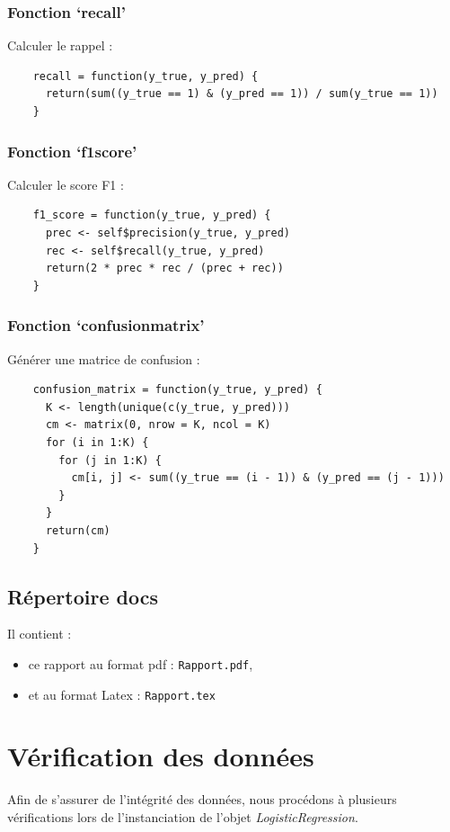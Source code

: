 \documentclass[10pt,french]{report}
\begin{document}
    \subsubsection{Fonction \enquote*{recall}}

    Calculer le rappel :
    \begin{verbatim}
    recall = function(y_true, y_pred) {
      return(sum((y_true == 1) & (y_pred == 1)) / sum(y_true == 1))
    }
    \end{verbatim}

    \subsubsection{Fonction \enquote*{f1\textunderscore score}}

    Calculer le score F1 :
    \begin{verbatim}
    f1_score = function(y_true, y_pred) {
      prec <- self$precision(y_true, y_pred)
      rec <- self$recall(y_true, y_pred)
      return(2 * prec * rec / (prec + rec))
    }
    \end{verbatim}

    \subsubsection{Fonction \enquote*{confusion\textunderscore matrix}}

    Générer une matrice de confusion :
    \begin{verbatim}
    confusion_matrix = function(y_true, y_pred) {
      K <- length(unique(c(y_true, y_pred)))
      cm <- matrix(0, nrow = K, ncol = K)
      for (i in 1:K) {
        for (j in 1:K) {
          cm[i, j] <- sum((y_true == (i - 1)) & (y_pred == (j - 1)))
        }
      }
      return(cm)
    }
    \end{verbatim}

	\subsection{Répertoire docs}

	Il contient :
	\begin{itemize}
		\item ce rapport au format pdf : \texttt{Rapport.pdf},
		\item et au format Latex : \texttt{Rapport.tex}
	\end{itemize}

	\section{Vérification des données}
	Afin de s'assurer de l'intégrité des données, nous procédons à plusieurs vérifications lors de l'instanciation de l'objet \textit{LogisticRegression}.
\end{document}
